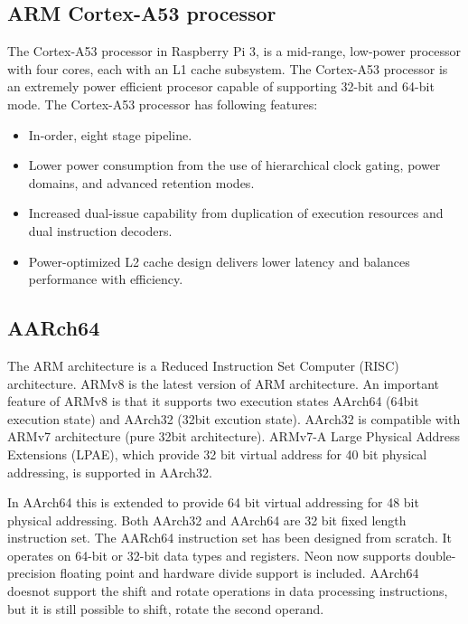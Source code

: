 \documentclass[journal]{IEEEtran}
\begin{document}
\subsection{ARM Cortex-A53 processor}
The Cortex-A53 processor in Raspberry Pi 3, is a mid-range, low-power processor with four cores, each with an L1 cache subsystem. The Cortex-A53 processor is an extremely power efficient procesor capable of supporting 32-bit and 64-bit mode.
The Cortex-A53 processor has following features:
\begin{itemize}
	\item In-order, eight stage pipeline.
	\item Lower power consumption from the use of hierarchical clock gating, power domains, and advanced retention modes.
	\item Increased dual-issue capability from duplication of execution resources and dual instruction decoders.
	\item Power-optimized L2 cache design delivers lower latency and balances performance with efficiency.
\end{itemize}

\subsection{AARch64}
The ARM architecture is a Reduced Instruction Set Computer (RISC) architecture. ARMv8 is the latest version of ARM architecture.  An important feature of ARMv8 is that it supports two execution states AArch64 (64bit execution state) and AArch32 (32bit excution state).  AArch32 is compatible with ARMv7 architecture (pure 32bit architecture).  ARMv7-A Large Physical Address Extensions (LPAE), which provide 32 bit virtual address for 40 bit physical addressing, is supported in AArch32.

In AArch64 this is extended to provide 64 bit virtual addressing for 48 bit physical addressing.  Both AArch32 and AArch64 are 32 bit fixed length instruction set.  The AARch64 instruction set has been designed from scratch.  It operates on 64-bit or 32-bit data types and registers.  Neon now supports double-precision floating point and hardware divide support is included.  AArch64 doesnot support the shift and rotate operations in data processing instructions,  but it is still possible to shift, rotate the second operand.
\end{document}
